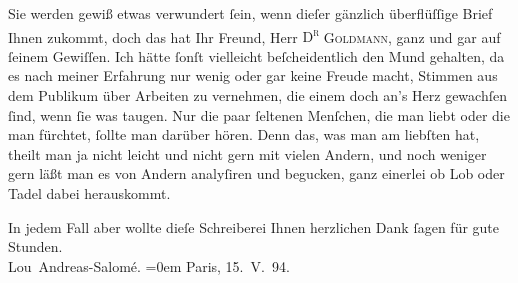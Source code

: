 \pstart
           Sie werden gewiß etwas verwundert{ }ſein, wenn dieſer gänzlich überflüſſige Brief Ihnen
               zukommt, doch das hat Ihr Freund, Herr \textsc{D\textsuperscript{r}}{ }\textsc{Goldmann}, ganz und gar auf{ }ſeinem Gewiſſen. Ich hätte{ }ſonſt vielleicht beſcheidentlich
               den Mund gehalten, da es nach meiner Erfahrung nur wenig oder gar keine Freude macht,
               Stimmen aus dem Publikum über Arbeiten zu vernehmen, die einem doch an’s Herz
               gewachſen{ }ſind, wenn{ }ſie was taugen. Nur die paar{ }ſeltenen Menſchen, die man liebt
               oder die man fürchtet,{ }ſollte man darüber hören. Denn das, was man am liebſten hat,
               theilt man ja {\pb}nicht leicht und nicht gern
               mit vielen Andern, und noch weniger gern läßt man es von Andern analyſiren und
               begucken, ganz einerlei ob Lob oder Tadel dabei herauskommt.\pend
           
\pstart
           In jedem Fall aber wollte dieſe Schreiberei Ihnen herzlichen Dank{ }ſagen für gute Stunden.{\\[\baselineskip]}\spacefill\mbox{Lou Andreas-Salomé.}\pend
           \leftskip=0em{}
\pstart
           Paris, 15. V. 94.\pend
           \endnumbering{}  \newcommand{\dateiname}{L00325}\newcommand{\titel}{Lou Andreas-Salomé an Arthur Schnitzler, 15. 5. 1894}\newcommand{\editorInnen}{Martin Anton Müller und Gerd-Hermann Susen}
